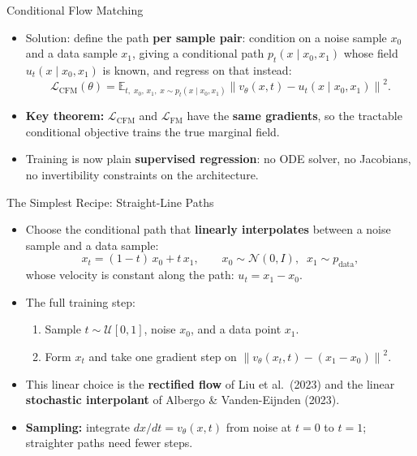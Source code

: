 \begin{frame}{Conditional Flow Matching}
\begin{itemize}
    \item Solution: define the path \textbf{per sample pair}: condition on a noise sample $x_0$ and a data sample $x_1$, giving a conditional path $p_t(x \mid x_0, x_1)$ whose field $u_t(x \mid x_0, x_1)$ is known, and regress on that instead:
    $$
    \mathcal{L}_{\mathrm{CFM}}(\theta) = \mathbb{E}_{t,\; x_0,\, x_1,\; x \sim p_t(x \mid x_0, x_1)} \left\| v_\theta(x, t) - u_t(x \mid x_0, x_1) \right\|^2 .
    $$
    \item \textbf{Key theorem:} $\mathcal{L}_{\mathrm{CFM}}$ and $\mathcal{L}_{\mathrm{FM}}$ have the \textbf{same gradients}, so the tractable conditional objective trains the true marginal field.
    \item Training is now plain \textbf{supervised regression}: no ODE solver, no Jacobians, no invertibility constraints on the architecture.
\end{itemize}
\end{frame}

\begin{frame}{The Simplest Recipe: Straight-Line Paths}
\begin{itemize}
    \item Choose the conditional path that \textbf{linearly interpolates} between a noise sample and a data sample:
    $$
    x_t = (1 - t)\, x_0 + t\, x_1, \qquad x_0 \sim \mathcal{N}(0, I),\;\; x_1 \sim p_{\mathrm{data}},
    $$
    whose velocity is constant along the path: $u_t = x_1 - x_0$.
    \item The full training step:
    \begin{enumerate}
        \item Sample $t \sim \mathcal{U}[0,1]$, noise $x_0$, and a data point $x_1$.
        \item Form $x_t$ and take one gradient step on $\left\| v_\theta(x_t, t) - (x_1 - x_0) \right\|^2$.
    \end{enumerate}
    \item This linear choice is the \textbf{rectified flow} of Liu et al.\ (2023) and the linear \textbf{stochastic interpolant} of Albergo \& Vanden-Eijnden (2023).
    \item \textbf{Sampling:} integrate $dx/dt = v_\theta(x, t)$ from noise at $t=0$ to $t=1$; straighter paths need fewer steps.
\end{itemize}
\end{frame}

